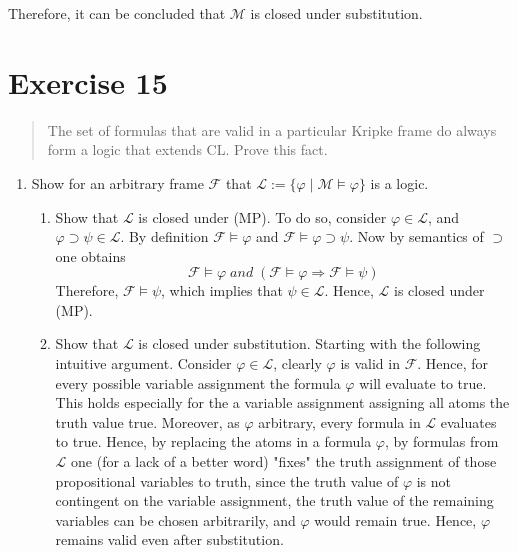 \documentclass[11pt,a4paper]{article}
\newcommand{\lto}{\supset}
\newcommand{\sand}{\; and \;}
\newcommand{\sto}{\Rightarrow}
\begin{document}
Therefore, it can be concluded that $\mathcal{M}$ is closed under substitution.

\section*{Exercise 15}
\begin{quote}
The set of formulas that are valid in a particular Kripke frame do always form a logic that extends CL.
Prove this fact.
\end{quote}

\begin{enumerate}
\item Show for an arbitrary frame $\mathcal{F}$ that $\mathcal{L}:=\{\varphi \mid \mathcal{M} \models \varphi\}$ is a logic.
\begin{enumerate}
\item Show that $\mathcal{L}$ is closed under (MP). To do so, consider $\varphi \in \mathcal{L}$, and $\varphi \lto \psi \in \mathcal{L}$. By definition $\mathcal{F} \models \varphi$  and $\mathcal{F} \models \varphi \lto \psi$. Now by semantics of $\lto$ one obtains
\begin{equation*}
\mathcal{F} \models \varphi \sand (\mathcal{F} \models \varphi \sto \mathcal{F} \models \psi)
\end{equation*}
Therefore, $\mathcal{F} \models \psi$, which implies that $\psi \in \mathcal{L}$. Hence, $\mathcal{L}$ is closed under (MP).
\item Show that $\mathcal{L}$ is closed under substitution. Starting with the following intuitive argument. Consider $\varphi \in \mathcal{L}$, clearly $\varphi$ is valid in $\mathcal{F}$. Hence, for every possible variable assignment the formula $\varphi$ will evaluate to true. This holds especially for the a variable assignment assigning all atoms the truth value true. Moreover, as $\varphi$ arbitrary, every formula in $\mathcal{L}$ evaluates to true. Hence, by replacing the atoms in a formula $\varphi$, by formulas from $\mathcal{L}$ one (for a lack of a better word) "fixes" the truth assignment of those propositional variables to truth, since the truth value of $\varphi$ is not contingent on the variable assignment, the truth value of the remaining variables can be chosen arbitrarily, and $\varphi$ would remain true. Hence, $\varphi$ remains valid even after substitution. \\


\end{enumerate}
\end{enumerate}
\end{document}
